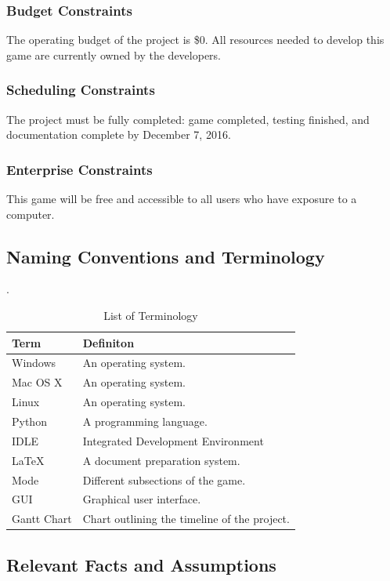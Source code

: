 \documentclass[12pt, titlepage]{article}
\begin{document}
\subsubsection{Budget Constraints}
The operating budget of the project is \$0. All resources needed to develop this game are currently owned by the developers.

\subsubsection{Scheduling Constraints}
The project must be fully completed: game completed, testing finished, and documentation complete by December 7, 2016.

\subsubsection{Enterprise Constraints}
This game will be free and accessible to all users who have exposure to a computer. 

\subsection{Naming Conventions and Terminology}
.
\begin{table}[h!]
	\centering
	\caption{List of Terminology}
	\label{tab:table3}
	\begin{tabular}{ll}
		\hline
		Term & Definiton\\
		\hline
		Windows & An operating system.\\
		Mac OS X & An operating system.\\
		Linux & An operating system.\\
		Python & A programming language.\\
		IDLE & Integrated Development Environment\\
		LaTeX & A document preparation system. \\
		Mode & Different subsections of the game.\\
		GUI & Graphical user interface.\\
		Gantt Chart &Chart outlining the timeline of the project.\\
		\hline
	\end{tabular}
\end{table}

\subsection{Relevant Facts and Assumptions}
\end{document}
